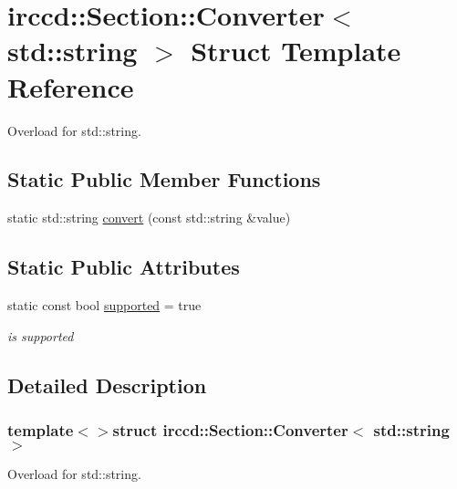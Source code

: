 \hypertarget{a00022}{\section{irccd\-:\-:Section\-:\-:Converter$<$ std\-:\-:string $>$ Struct Template Reference}
\label{a00022}
}


Overload for std\-::string.  


\subsection*{Static Public Member Functions}
\begin{DoxyCompactItemize}
\item 
static std\-::string \hyperlink{a00022_ab27817fab09706f5efa5c6397ab3c282}{convert} (const std\-::string \&value)
\end{DoxyCompactItemize}
\subsection*{Static Public Attributes}
\begin{DoxyCompactItemize}
\item 
\hypertarget{a00022_a202be164b38d4fd41bbf11c7776f9dba}{static const bool \hyperlink{a00022_a202be164b38d4fd41bbf11c7776f9dba}{supported} = true}\label{a00022_a202be164b38d4fd41bbf11c7776f9dba}

\begin{DoxyCompactList}\small\item\em is supported \end{DoxyCompactList}\end{DoxyCompactItemize}


\subsection{Detailed Description}
\subsubsection*{template$<$$>$struct irccd\-::\-Section\-::\-Converter$<$ std\-::string $>$}

Overload for std\-::string. 

